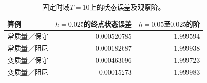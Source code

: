 \begin{table}[t]
\centering\small
\caption{固定时域$T=10$上的状态误差及观察阶。}
\label{tab:convergence}
\begin{tabular}{lrr}
\toprule
算例 & $h=0.025$的终点状态误差 & $h=0.05$至$0.025$的阶 \\
\midrule
常质量／保守 & $0.000520785$ & $1.999594$ \\
常质量／阻尼 & $0.000182687$ & $1.999938$ \\
变质量／保守 & $0.000463096$ & $1.999723$ \\
变质量／阻尼 & $0.00015273$ & $1.999983$ \\
\bottomrule
\end{tabular}

\end{table}
